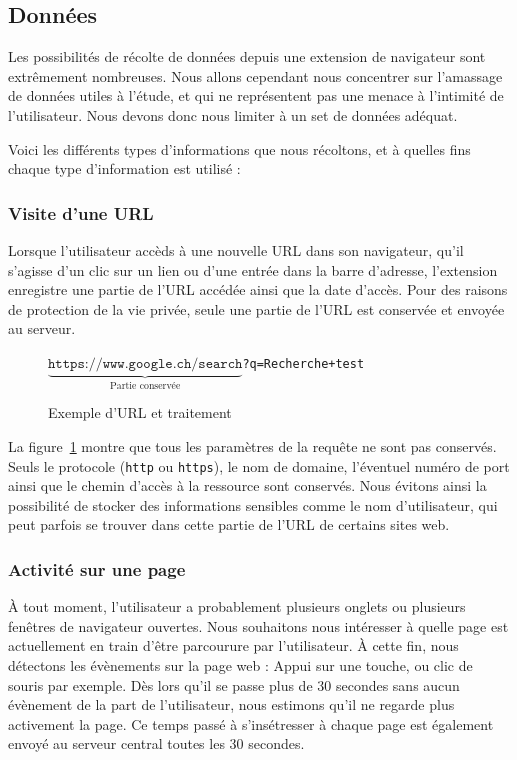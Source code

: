 	\subsection{Données}\label{d-donnees}

		Les possibilités de récolte de données depuis une extension de navigateur sont extrêmement nombreuses. Nous allons cependant nous concentrer sur l'amassage de données utiles à l'étude, et qui ne représentent pas une menace à l'intimité de l'utilisateur. Nous devons donc nous limiter à un set de données adéquat. 

		Voici les différents types d'informations que nous récoltons, et à quelles fins chaque type d'information est utilisé :

		\subsubsection{Visite d'une URL}
			
			Lorsque l'utilisateur accèds à une nouvelle URL dans son navigateur, qu'il s'agisse d'un clic sur un lien ou d'une entrée dans la barre d'adresse, l'extension enregistre une partie de l'URL accédée ainsi que la date d'accès. Pour des raisons de protection de la vie privée, seule une partie de l'URL est conservée et envoyée au serveur.

			\begin{figure}[h]
				\centering
				$\underbrace{\texttt{https://www.google.ch/search}}_{\text{Partie conservée}}$\texttt{?q=Recherche+test}
				\caption{Exemple d'URL et traitement}
				\label{d-url}
			\end{figure}

			La figure~\ref{d-url} montre que tous les paramètres de la requête ne sont pas conservés. Seuls le protocole (\texttt{http} ou \texttt{https}), le nom de domaine, l'éventuel numéro de port ainsi que le chemin d'accès à la ressource sont conservés. Nous évitons ainsi la possibilité de stocker des informations sensibles comme le nom d'utilisateur, qui peut parfois se trouver dans cette partie de l'URL de certains sites web.

		\subsubsection{Activité sur une page}

			À tout moment, l'utilisateur a probablement plusieurs onglets ou plusieurs fenêtres de navigateur ouvertes. Nous souhaitons nous intéresser à quelle page est actuellement en train d'être parcourure par l'utilisateur. À cette fin, nous détectons les évènements sur la page web : Appui sur une touche, ou clic de souris par exemple. Dès lors qu'il se passe plus de 30 secondes sans aucun évènement de la part de l'utilisateur, nous estimons qu'il ne regarde plus activement la page. Ce temps passé à s'insétresser à chaque page est également envoyé au serveur central toutes les 30 secondes.

